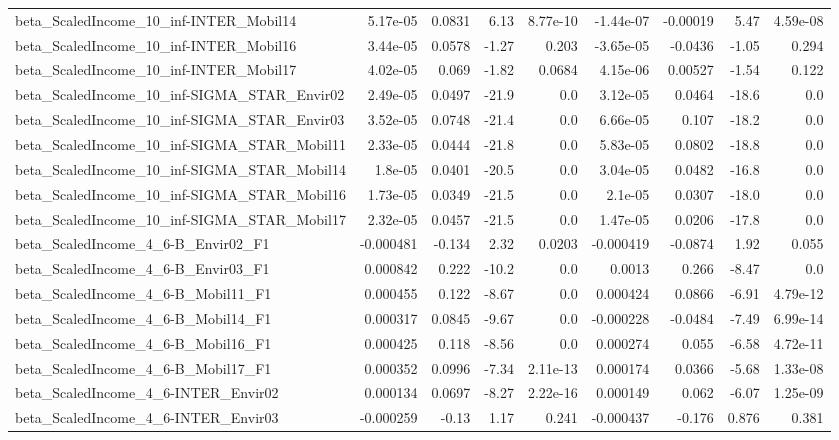 \begin{tabular}{lrrrrrrrr}
beta_ScaledIncome_10_inf-INTER_Mobil14 & 5.17e-05 & 0.0831 & 6.13 & 8.77e-10 & -1.44e-07 & -0.00019 & 5.47 & 4.59e-08 \\
beta_ScaledIncome_10_inf-INTER_Mobil16 & 3.44e-05 & 0.0578 & -1.27 & 0.203 & -3.65e-05 & -0.0436 & -1.05 & 0.294 \\
beta_ScaledIncome_10_inf-INTER_Mobil17 & 4.02e-05 & 0.069 & -1.82 & 0.0684 & 4.15e-06 & 0.00527 & -1.54 & 0.122 \\
beta_ScaledIncome_10_inf-SIGMA_STAR_Envir02 & 2.49e-05 & 0.0497 & -21.9 & 0.0 & 3.12e-05 & 0.0464 & -18.6 & 0.0 \\
beta_ScaledIncome_10_inf-SIGMA_STAR_Envir03 & 3.52e-05 & 0.0748 & -21.4 & 0.0 & 6.66e-05 & 0.107 & -18.2 & 0.0 \\
beta_ScaledIncome_10_inf-SIGMA_STAR_Mobil11 & 2.33e-05 & 0.0444 & -21.8 & 0.0 & 5.83e-05 & 0.0802 & -18.8 & 0.0 \\
beta_ScaledIncome_10_inf-SIGMA_STAR_Mobil14 & 1.8e-05 & 0.0401 & -20.5 & 0.0 & 3.04e-05 & 0.0482 & -16.8 & 0.0 \\
beta_ScaledIncome_10_inf-SIGMA_STAR_Mobil16 & 1.73e-05 & 0.0349 & -21.5 & 0.0 & 2.1e-05 & 0.0307 & -18.0 & 0.0 \\
beta_ScaledIncome_10_inf-SIGMA_STAR_Mobil17 & 2.32e-05 & 0.0457 & -21.5 & 0.0 & 1.47e-05 & 0.0206 & -17.8 & 0.0 \\
beta_ScaledIncome_4_6-B_Envir02_F1 & -0.000481 & -0.134 & 2.32 & 0.0203 & -0.000419 & -0.0874 & 1.92 & 0.055 \\
beta_ScaledIncome_4_6-B_Envir03_F1 & 0.000842 & 0.222 & -10.2 & 0.0 & 0.0013 & 0.266 & -8.47 & 0.0 \\
beta_ScaledIncome_4_6-B_Mobil11_F1 & 0.000455 & 0.122 & -8.67 & 0.0 & 0.000424 & 0.0866 & -6.91 & 4.79e-12 \\
beta_ScaledIncome_4_6-B_Mobil14_F1 & 0.000317 & 0.0845 & -9.67 & 0.0 & -0.000228 & -0.0484 & -7.49 & 6.99e-14 \\
beta_ScaledIncome_4_6-B_Mobil16_F1 & 0.000425 & 0.118 & -8.56 & 0.0 & 0.000274 & 0.055 & -6.58 & 4.72e-11 \\
beta_ScaledIncome_4_6-B_Mobil17_F1 & 0.000352 & 0.0996 & -7.34 & 2.11e-13 & 0.000174 & 0.0366 & -5.68 & 1.33e-08 \\
beta_ScaledIncome_4_6-INTER_Envir02 & 0.000134 & 0.0697 & -8.27 & 2.22e-16 & 0.000149 & 0.062 & -6.07 & 1.25e-09 \\
beta_ScaledIncome_4_6-INTER_Envir03 & -0.000259 & -0.13 & 1.17 & 0.241 & -0.000437 & -0.176 & 0.876 & 0.381 \\

\end{tabular}
